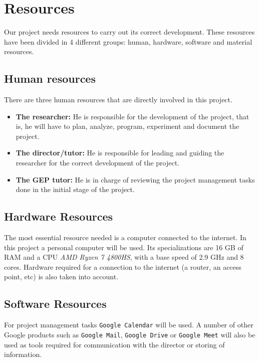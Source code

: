 \section{Resources}

Our project needs resources to carry out its correct development. These resources have been divided in 4 different groups: human, hardware, software and material resources.

\subsection{Human resources}
\label{sec:human_resources}

There are three human resources that are directly involved in this project.

\begin{itemize}
    \item \textbf{The researcher:} He is responsible for the development of the project, that is, he will have to plan, analyze, program, experiment and document the project.
    \item \textbf{The director/tutor:} He is responsible for leading and guiding the researcher for the correct development of the project.
    \item \textbf{The GEP tutor:} He is in charge of reviewing the project management tasks done in the initial stage of the project.
\end{itemize}

\subsection{Hardware Resources}
\label{sec:hardware_resources}

The most essential resource needed is a computer connected to the internet. In this project a personal computer will be used. Its specializations are 16 GB of RAM and a CPU \emph{AMD Ryzen 7 4800HS}, with a base speed of 2.9 GHz and 8 cores. Hardware required for a connection to the internet (a router, an access point, etc) is also taken into account.

\subsection{Software Resources}

For project management tasks \texttt{Google Calendar} will be used. A number of other Google products such as \texttt{Google Mail}, \texttt{Google Drive} or \texttt{Google Meet} will also be used as tools required for communication with the director or storing of information.

